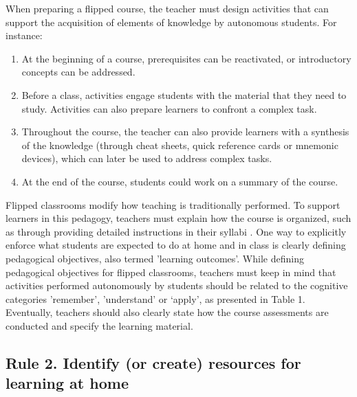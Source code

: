 \documentclass[10pt,letterpaper]{article}
\begin{document}
When preparing a flipped course, the teacher must design activities that can support 
the acquisition of elements of knowledge by autonomous students. For instance:

\begin{enumerate}

\item At the beginning of a course, prerequisites can be reactivated, or introductory concepts can be addressed.

\item Before a class, activities engage students with the material that they need to study. 
Activities can also prepare learners to confront a complex task.

\item Throughout the course, the teacher can also provide learners with a synthesis of the knowledge 
(through cheat sheets, quick reference cards or mnemonic devices), which can later be used to address complex tasks.

\item At the end of the course, students could work on a summary of the course.

\end{enumerate}

Flipped classrooms modify how teaching is traditionally performed. To support learners in this pedagogy, 
teachers must explain how the course is organized, such as through providing detailed instructions in
their syllabi \cite{grunert_obrien_course_2008}. One way to explicitly enforce what students 
are expected to do at home and in class is clearly defining pedagogical objectives, also termed 'learning outcomes'. 
While defining pedagogical objectives for flipped classrooms, teachers must keep in mind 
that activities performed autonomously by students should be related to the cognitive categories 'remember', 'understand' 
or `apply', as presented in Table 1. Eventually, teachers should also clearly state how the course assessments 
are conducted and specify the learning material.


\subsection{Rule 2. Identify (or create) resources for learning at home}
\end{document}
